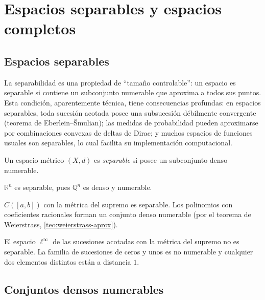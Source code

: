 \chapter{Espacios separables y espacios completos}
\label{ch:espacios-separables}

\section{Espacios separables}

La separabilidad es una propiedad de ``tamaño controlable'': un espacio es separable si contiene un subconjunto numerable que aproxima a todos sus puntos. Esta condición, aparentemente técnica, tiene consecuencias profundas: en espacios separables, toda sucesión acotada posee una subsucesión débilmente convergente (teorema de Eberlein--Šmulian); las medidas de probabilidad pueden aproximarse por combinaciones convexas de deltas de Dirac; y muchos espacios de funciones usuales son separables, lo cual facilita su implementación computacional.

\begin{definition}
\label{def:separable}
Un espacio métrico $(X,d)$ es \emph{separable} si posee un subconjunto denso numerable.
\end{definition}

\begin{example}
\label{ej:rn-separable}
$\mathbb{R}^n$ es separable, pues $\mathbb{Q}^n$ es denso y numerable.
\end{example}

\begin{example}
\label{ej:cb-separable}
$C([a,b])$ con la métrica del supremo es separable. Los polinomios con coeficientes racionales forman un conjunto denso numerable (por el teorema de Weierstrass, \cref{teo:weierstrass-aprox}).
\end{example}

\begin{example}
\label{ej:linf-no-separable}
El espacio $\ell^{\infty}$ de las sucesiones acotadas con la métrica del supremo no es separable. La familia de sucesiones de ceros y unos es no numerable y cualquier dos elementos distintos están a distancia $1$.
\end{example}

\section{Conjuntos densos numerables}

